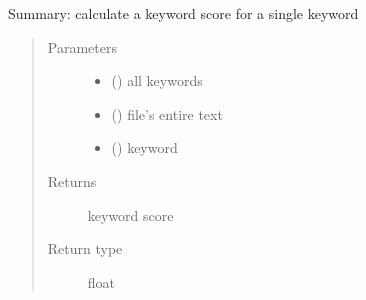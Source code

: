 \documentclass[letterpaper,10pt,english]{sphinxmanual}
\begin{document}
\begin{fulllineitems}
\label{\detokenize{functionsv1:analyze_functions.calculatekeywordscore}}
Summary: calculate a keyword score for a single keyword
\begin{quote}\begin{description}
\item[{Parameters}] \leavevmode\begin{itemize}
\item {} 
 ({\hyperref[\detokenize{KeywordList:module-KeywordList}]{}}) \textendash{} all keywords

\item {} 
 (\sphinxstyleliteralemphasis{{[}}\sphinxstyleliteralemphasis{{]}}) \textendash{} file’s entire text

\item {} 
 ({\hyperref[\detokenize{Keyword:module-Keyword}]{}}) \textendash{} keyword

\end{itemize}

\item[{Returns}] \leavevmode
keyword score

\item[{Return type}] \leavevmode
float

\end{description}\end{quote}

\end{fulllineitems}

\end{document}
